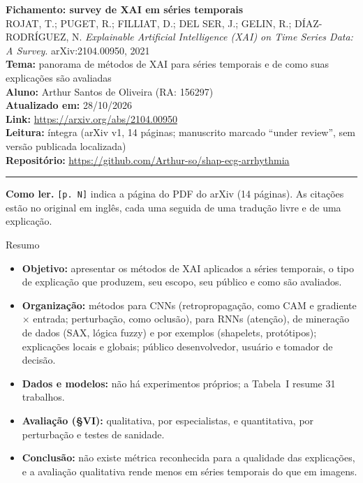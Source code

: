 \documentclass[11pt,a4paper]{article}
\begin{document}
\sloppy

\begin{center}
    {\LARGE \textbf{Fichamento: survey de XAI em séries temporais}} \\[0.35em]
    {\large ROJAT, T.; PUGET, R.; FILLIAT, D.; DEL SER, J.; GELIN, R.; DÍAZ-RODRÍGUEZ, N. \textit{Explainable Artificial Intelligence (XAI) on Time Series Data: A Survey}. arXiv:2104.00950, 2021} \\[0.3em]
    \textbf{Tema:} panorama de métodos de XAI para séries temporais e de como suas explicações são avaliadas \\[0.2em]
    \textbf{Aluno:} Arthur Santos de Oliveira (RA: 156297) \\[0.2em]
    \textbf{Atualizado em:} 28/10/2026 \\[0.2em]
    \textbf{Link:} \url{https://arxiv.org/abs/2104.00950} \\[0.2em]
    \textbf{Leitura:} íntegra (arXiv v1, 14 páginas; manuscrito marcado “under review”, sem versão publicada localizada) \\[0.2em]
    \textbf{Repositório:} \url{https://github.com/Arthur-so/shap-ecg-arrhythmia}
\end{center}
\vspace{-0.5em}
\hrule
\vspace{0.8em}

\textbf{Como ler.} \texttt{[p. N]} indica a página do PDF do arXiv (14 páginas). As citações estão no original em inglês, cada uma seguida de uma tradução livre e de uma explicação.

\begin{infobox}[note]{Resumo}
\begin{itemize}
\item \textbf{Objetivo:} apresentar os métodos de XAI aplicados a séries temporais, o tipo de explicação que produzem, seu escopo, seu público e como são avaliados.
\item \textbf{Organização:} métodos para CNNs (retropropagação, como CAM e gradiente $\times$ entrada; perturbação, como oclusão), para RNNs (atenção), de mineração de dados (SAX, lógica fuzzy) e por exemplos (shapelets, protótipos); explicações locais e globais; público desenvolvedor, usuário e tomador de decisão.
\item \textbf{Dados e modelos:} não há experimentos próprios; a Tabela~I resume 31 trabalhos.
\item \textbf{Avaliação (§VI):} qualitativa, por especialistas, e quantitativa, por perturbação e testes de sanidade.
\item \textbf{Conclusão:} não existe métrica reconhecida para a qualidade das explicações, e a avaliação qualitativa rende menos em séries temporais do que em imagens.
\end{itemize}
\end{infobox}
\end{document}
